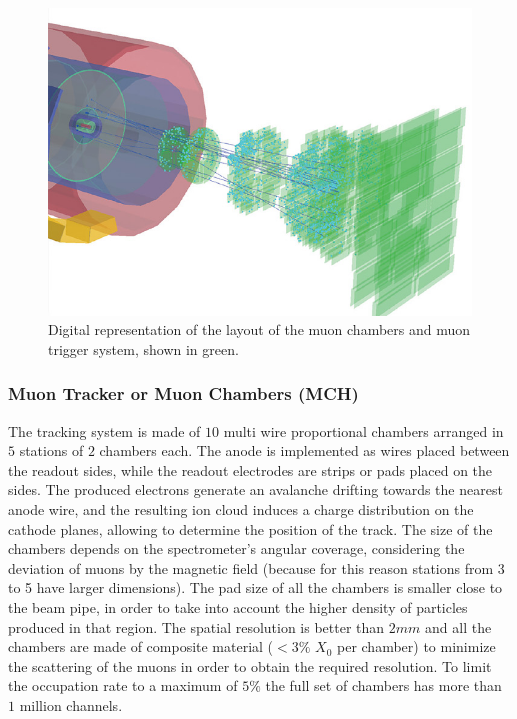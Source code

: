 \begin{figure}[th]
\begin{center}
\includegraphics[width=\linewidth]{Chapters/Introduction/Figs/muon_mtr_mch.jpg}
\caption{Digital representation of the layout of the muon chambers and muon trigger system, shown in green.}
\label{fig:mch_mtr}
\end{center}
\end{figure}

\subsubsection{Muon Tracker or Muon Chambers (MCH)}
The tracking system is made of $10$ multi wire proportional chambers arranged in $5$ stations of $2$ chambers each.
The anode is implemented as wires placed between the readout sides, while the readout electrodes are strips or pads placed on the sides.
The produced electrons generate an avalanche drifting towards the nearest anode wire, and the resulting ion cloud induces a charge distribution on the cathode planes, allowing to determine the position of the track.
The size of the chambers depends on the spectrometer’s angular coverage, considering the deviation of muons by the magnetic field (because for this reason stations from 3 to 5 have larger dimensions).
The pad size of all the chambers is smaller close to the beam pipe, in order to take into account the higher density of particles produced in that region.
The spatial resolution is better than $2 mm$ and all the chambers are made of composite material ($< 3\%$ $X_0$ per chamber) to minimize the scattering of the muons in order to obtain the required resolution. 
To limit the occupation rate to a maximum of $5\%$ the full set of chambers has more than $1$ million channels.

